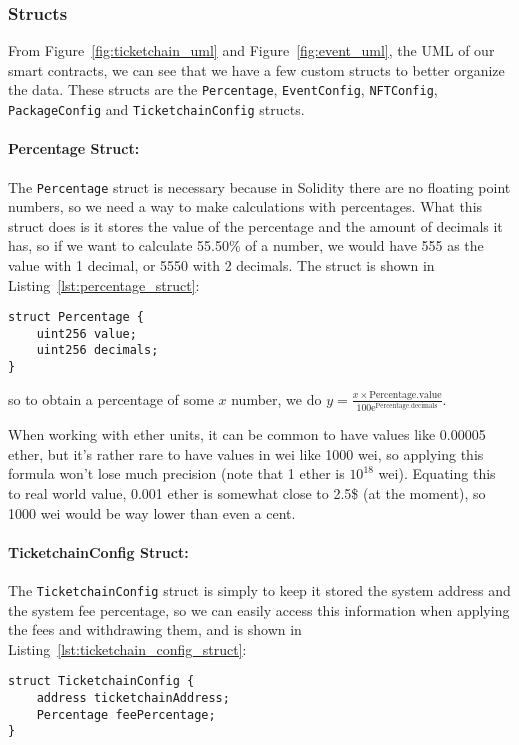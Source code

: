 \subsubsection{Structs}\label{subsubsec:structs}

From Figure~\ref{fig:ticketchain_uml} and Figure~\ref{fig:event_uml}, the UML
of our smart contracts, we can see that we have a few custom structs to better
organize the data. These structs are the \texttt{Percentage},
\texttt{EventConfig}, \texttt{NFTConfig}, \texttt{PackageConfig} and
\texttt{TicketchainConfig} structs.

\paragraph{Percentage Struct:} The \texttt{Percentage} struct is necessary because in Solidity there are no
floating point numbers, so we need a way to make calculations with percentages.
What this struct does is it stores the value of the percentage and the amount
of decimals it has, so if we want to calculate 55.50\% of a number, we would
have 555 as the value with 1 decimal, or 5550 with 2 decimals. The struct is
shown in Listing~\ref{lst:percentage_struct}:
\begin{lstlisting}[caption=Percentage struct,label={lst:percentage_struct}]
struct Percentage {
	uint256 value;
	uint256 decimals;
}
\end{lstlisting}
so to obtain a percentage of some $x$ number, we do $y = \frac{x \times
		\text{Percentage.value}}{100\mathrm{e}^\text{Percentage.decimals}}$.

When working with ether units, it can be common to have values like 0.00005
ether, but it's rather rare to have values in wei like 1000 wei, so applying
this formula won't lose much precision (note that 1 ether is $10^{18}$ wei).
Equating this to real world value, 0.001 ether is somewhat close to 2.5\$ (at
the moment), so 1000 wei would be way lower than even a cent.

\paragraph{TicketchainConfig Struct:} The \texttt{TicketchainConfig} struct is simply to keep it stored the system
address and the system fee percentage, so we can easily access this information
when applying the fees and withdrawing them, and is shown in
Listing~\ref{lst:ticketchain_config_struct}:
\begin{lstlisting}[caption=TicketchainConfig struct,label={lst:ticketchain_config_struct}]
struct TicketchainConfig {
    address ticketchainAddress;
    Percentage feePercentage;
}
\end{lstlisting}

